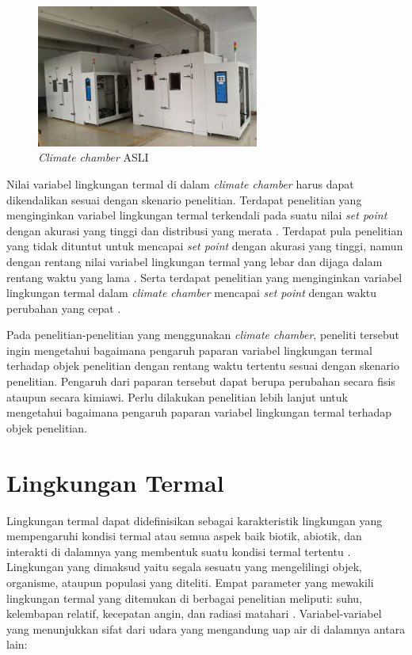 \vspace{1mm}

\begin{figure}[!h]
	\centering
	\includegraphics[width=0.65\textwidth]{figures/ChamberASLI}
	\caption{\textit{Climate chamber}  ASLI \cite{ChamberASLI}}
	\label{fig:3:ChamberASLI}
\end{figure}

Nilai variabel lingkungan termal di dalam \textit{climate chamber} harus dapat dikendalikan sesuai dengan skenario penelitian. Terdapat penelitian yang menginginkan variabel lingkungan termal terkendali pada suatu nilai \textit{set point} dengan akurasi yang tinggi dan distribusi yang merata \cite{paper31WHe}. Terdapat pula penelitian yang tidak dituntut untuk mencapai \textit{set point} dengan akurasi yang tinggi, namun dengan rentang nilai variabel lingkungan termal yang lebar dan dijaga dalam rentang waktu yang lama \cite{paper31APLeskinen, paper31AHuguet, paper31EJofre, paper31Srinivasa}. Serta terdapat penelitian yang menginginkan variabel lingkungan termal dalam \textit{climate chamber} mencapai \textit{set point} dengan waktu perubahan yang cepat \cite{paper31Emartinez}.

Pada penelitian-penelitian yang menggunakan \textit{climate chamber}, peneliti tersebut ingin mengetahui bagaimana pengaruh paparan variabel lingkungan termal terhadap objek penelitian dengan rentang waktu tertentu sesuai dengan skenario penelitian. Pengaruh dari paparan tersebut dapat berupa perubahan secara fisis ataupun secara kimiawi. Perlu dilakukan penelitian lebih lanjut untuk mengetahui bagaimana pengaruh paparan variabel lingkungan termal terhadap objek penelitian.\\

\section{Lingkungan Termal}

Lingkungan termal dapat didefinisikan sebagai karakteristik lingkungan yang mempengaruhi kondisi termal \cite{ASHRAE55} atau semua aspek baik biotik, abiotik, dan interakti di dalamnya yang membentuk suatu kondisi termal tertentu \cite{book1}. Lingkungan yang dimaksud yaitu segala sesuatu yang mengelilingi objek, organisme, ataupun populasi yang diteliti. Empat parameter yang mewakili lingkungan termal yang ditemukan di berbagai penelitian meliputi: suhu, kelembapan relatif, kecepatan angin, dan radiasi matahari \cite{book1}. Variabel-variabel yang menunjukkan sifat dari udara yang mengandung uap air di dalamnya antara lain: \cite{skripsiIchfan}

